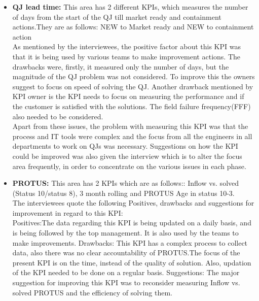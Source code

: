 \begin{itemize}
    
     \item \textbf{QJ lead time:} This area has 2 different KPIs, which measures the number of days from the start of the QJ till market ready and containment actions.They are as follows:
     NEW to Market ready and NEW to containment action
\\

As mentioned by the interviewees, the positive factor about this KPI was that it is being used by various teams to make improvement actions.
The drawbacks were, firstly, it measured only the number of days, but the magnitude of the QJ problem was not considered. To improve this the owners suggest to focus on speed of solving the QJ. Another drawback mentioned by KPI owner is the KPI needs to focus on measuring the performance and if the customer is satisfied with the solutions. The field failure frequency(FFF) also needed to be considered.\\

Apart from these issues, the problem with measuring this KPI was that the process and IT tools  were complex and the focus from all the engineers in all departments to work on QJs was necessary.
Suggestions on how the KPI could be improved was also given the interview which is to alter the focus area frequently, in order to concentrate on the various issues in each phase.

\item \textbf{PROTUS:} This area has 2 KPIs which are as follows::
     Inflow vs. solved (Status 10/status 8), 3 month rolling and
PROTUS Age in status 10-3.\\

The interviewees quote the following Positives, drawbacks and suggestions for improvement in regard to this KPI:\\

Positives:The data regarding this KPI is being updated on a daily basis, and is being followed by the top management. It is also used by the teams to make improvements. 
Drawbacks: This KPI has a complex  process to collect data, also there was no clear accountability of PROTUS.The focus of the present KPI is on the time, instead of the quality of solution. Also, updation of the KPI needed to be done on a regular basis. 
Suggestions: The major suggestion for improving this KPI was to reconsider measuring Inflow vs. solved PROTUS and the efficiency of solving them.

\end{itemize}

